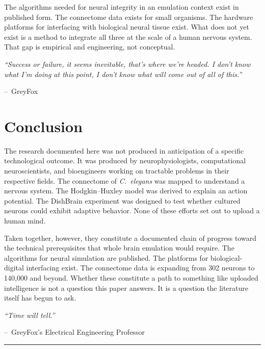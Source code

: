 \documentclass[11pt,a4paper]{article}
\renewenvironment{quote}
  {\list{}{\leftmargin=2.2em\rightmargin=2.2em\topsep=0.4em\parsep=0.3em}%
   \item\relax\itshape}
  {\endlist}
\newcommand{\attrib}[1]{\par\vspace{0.2em}\normalfont\small\hspace*{0em}--\ #1\par}
\begin{document}
The algorithms needed for neural integrity in an emulation context exist in published form. The connectome data exists for small organisms. The hardware platforms for interfacing with biological neural tissue exist. What does not yet exist is a method to integrate all three at the scale of a human nervous system. That gap is empirical and engineering, not conceptual.

\begin{quote}
``Success or failure, it seems inevitable, that's where we're headed. I don't know what I'm doing at this point, I don't know what will come out of all of this.''
\attrib{GreyFox}
\end{quote}

\section{Conclusion}

The research documented here was not produced in anticipation of a specific technological outcome. It was produced by neurophysiologists, computational neuroscientists, and bioengineers working on tractable problems in their respective fields. The connectome of \textit{C.~elegans} was mapped to understand a nervous system. The Hodgkin--Huxley model was derived to explain an action potential. The DishBrain experiment was designed to test whether cultured neurons could exhibit adaptive behavior. None of these efforts set out to upload a human mind.

Taken together, however, they constitute a documented chain of progress toward the technical prerequisites that whole brain emulation would require. The algorithms for neural simulation are published. The platforms for biological-digital interfacing exist. The connectome data is expanding from 302 neurons to 140,000 and beyond. Whether these constitute a path to something like uploaded intelligence is not a question this paper answers. It is a question the literature itself has begun to ask.

\begin{quote}
``Time will tell.''
\attrib{GreyFox's Electrical Engineering Professor}
\end{quote}

\vspace{0.4em}
\noindent\rule{\textwidth}{0.4pt}

\end{document}
